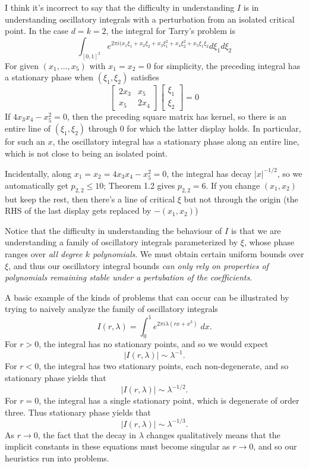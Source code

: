 \documentclass[12pt]{article}
\theoremstyle{definition}
\theoremstyle{remark}
\numberwithin{equation}{section}
\begin{document}
     {\color{red} I think it's incorrect to say that the difficulty in understanding $I$ is in understanding oscillatory integrals with a perturbation from an isolated critical point. In the case $d=k=2$, the integral for Tarry's problem is
    \begin{equation*}
        \int_{[0,1]^2}e^{2\pi i(x_1\xi_1+x_2\xi_2+x_3\xi_1^2+x_4\xi_2^2+x_5\xi_1\xi_2}d\xi_1d\xi_2
    \end{equation*}
    For given $(x_1,\ldots,x_5)$ with $x_1=x_2=0$ for simplicity, the preceding integral has a stationary phase when $(\xi_1,\xi_2)$ satisfies
    \begin{equation*}
        \begin{bmatrix}
        2x_3 & x_5\\x_5 & 2x_4
        \end{bmatrix}\begin{bmatrix}
            \xi_1\\\xi_2
        \end{bmatrix}=0
    \end{equation*}
    If $4x_3x_4-x_5^2=0$, then the preceding square matrix has kernel, so there is an entire line of $(\xi_1,\xi_2)$ through $0$ for which the latter display holds. In particular, for such an $x$, the oscillatory integral has a stationary phase along an entire line, which is not close to being an isolated point.

    Incidentally, along $x_1=x_2=4x_3x_4-x_5^2=0$, the integral has decay $|x|^{-1/2}$, so we automatically get $p_{2,2}\leq 10$; Theorem 1.2 gives $p_{2,2}=6$. If you change $(x_1,x_2)$ but keep the rest, then there's a line of critical $\xi$ but not through the origin (the RHS of the last display gets replaced by $-(x_1,x_2)$)
    }

	Notice that the difficulty in understanding the behaviour of $I$ is that we are understanding a family of oscillatory integrals parameterized by $\xi$, whose phase ranges over \emph{all degree $k$ polynomials}. We must obtain certain uniform bounds over $\xi$, and thus our oscillatory integral bounds \emph{can only rely on properties of polynomials remaining stable under a pertubation of the coefficients}.

	A basic example of the kinds of problems that can occur can be illustrated by trying to naively analyze the family of oscillatory integrals
	\[ I(r,\lambda) = \int_0^1 e^{2\pi i \lambda (rx + x^3)}\; dx. \]
	For $r > 0$, the integral has no stationary points, and so we would expect
	\[ |I(r,\lambda)| \sim \lambda^{-1}. \]
	For $r < 0$, the integral has two stationary points, each non-degenerate, and so stationary phase yields that
	\[ |I(r,\lambda)| \sim \lambda^{-1/2}. \]
	For $r = 0$, the integral has a single stationary point, which is degenerate of order three. Thus stationary phase yields that
	\[ |I(r,\lambda)| \sim \lambda^{-1/3}. \]
	As $r \to 0$, the fact that the decay in $\lambda$ changes qualitatively means that the implicit constants in these equations must become singular as $r \to 0$, and so our heuristics run into problems.
\end{document}
